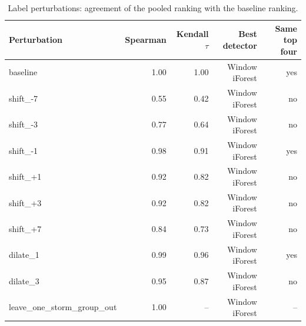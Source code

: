\begin{table}[t]
\centering
\small
\begin{tabular}{lrrrr}
\toprule
Perturbation & Spearman & Kendall $\tau$ & Best detector & Same top four \\
\midrule
baseline & 1.00 & 1.00 & Window iForest & yes \\
shift\_-7 & 0.55 & 0.42 & Window iForest & no \\
shift\_-3 & 0.77 & 0.64 & Window iForest & no \\
shift\_-1 & 0.98 & 0.91 & Window iForest & yes \\
shift\_+1 & 0.92 & 0.82 & Window iForest & no \\
shift\_+3 & 0.92 & 0.82 & Window iForest & no \\
shift\_+7 & 0.84 & 0.73 & Window iForest & no \\
dilate\_1 & 0.99 & 0.96 & Window iForest & yes \\
dilate\_3 & 0.95 & 0.87 & Window iForest & no \\
leave\_one\_storm\_group\_out & 1.00 & -- & Window iForest & -- \\
\bottomrule
\end{tabular}
\caption{Label perturbations: agreement of the pooled ranking with the baseline ranking.}
\label{tab:step10-perturb}
\end{table}